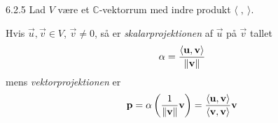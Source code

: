 \begin{definition}{6.2.5}
	Lad $V$ være et $\mathbb{C}$-vektorrum med indre produkt 
	$\langle\;,\:\rangle$.

	Hvis $\vec{u}, \vec{v} \in V$, $\vec{v} \not= 0$, så er 
	\textit{skalarprojektionen} af $\vec{u}$ på $\vec{v}$ tallet
	\[
		\alpha = \frac{\langle\mathbf{u},\mathbf{v}\rangle}{\lVert\mathbf{v}\rVert}
	\]
	mens \textit{vektorprojektionen} er
	\[
		\mathbf{p} = \alpha\left(\frac{1}{\lVert\mathbf{v}\rVert}\mathbf{v}\right) = 
		\frac{\langle\mathbf{u},\mathbf{v}\rangle}{\langle\mathbf{v},\mathbf{v}\rangle}
		\mathbf{v}
	\]
\end{definition}
